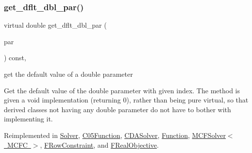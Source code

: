 \mbox{\label{class_s_m_spp__di__unipi__it_1_1_thin_compute_interface_ae2d249f431892cbf41ccf19204b78228}} 
\subsubsection{\texorpdfstring{get\+\_\+dflt\+\_\+dbl\+\_\+par()}{get\_dflt\_dbl\_par()}}
{\footnotesize\ttfamily virtual double get\+\_\+dflt\+\_\+dbl\+\_\+par (\begin{DoxyParamCaption}\item[{const \mbox{\hyperlink{class_s_m_spp__di__unipi__it_1_1_thin_compute_interface_aa3d710629ad8c434286726ad810c3b47}{idx\+\_\+type}}}]{par }\end{DoxyParamCaption}) const\hspace{0.3cm}{\ttfamily [inline]}, {\ttfamily [virtual]}}



get the default value of a double parameter 

Get the default value of the double parameter with given index. The method is given a void implementation (returning 0), rather than being pure virtual, so that derived classes not having any double parameter do not have to bother with implementing it. 

Reimplemented in \mbox{\hyperlink{class_s_m_spp__di__unipi__it_1_1_solver_a465a771c115acf8d5f4e32e22f003014}{Solver}}, \mbox{\hyperlink{class_s_m_spp__di__unipi__it_1_1_c05_function_a465a771c115acf8d5f4e32e22f003014}{C05\+Function}}, \mbox{\hyperlink{class_s_m_spp__di__unipi__it_1_1_c_d_a_solver_a465a771c115acf8d5f4e32e22f003014}{C\+D\+A\+Solver}}, \mbox{\hyperlink{class_s_m_spp__di__unipi__it_1_1_function_a465a771c115acf8d5f4e32e22f003014}{Function}}, \mbox{\hyperlink{class_s_m_spp__di__unipi__it_1_1_m_c_f_solver_a465a771c115acf8d5f4e32e22f003014}{M\+C\+F\+Solver$<$ M\+C\+F\+C $>$}}, \mbox{\hyperlink{class_s_m_spp__di__unipi__it_1_1_f_row_constraint_a465a771c115acf8d5f4e32e22f003014}{F\+Row\+Constraint}}, and \mbox{\hyperlink{class_s_m_spp__di__unipi__it_1_1_f_real_objective_a465a771c115acf8d5f4e32e22f003014}{F\+Real\+Objective}}.

